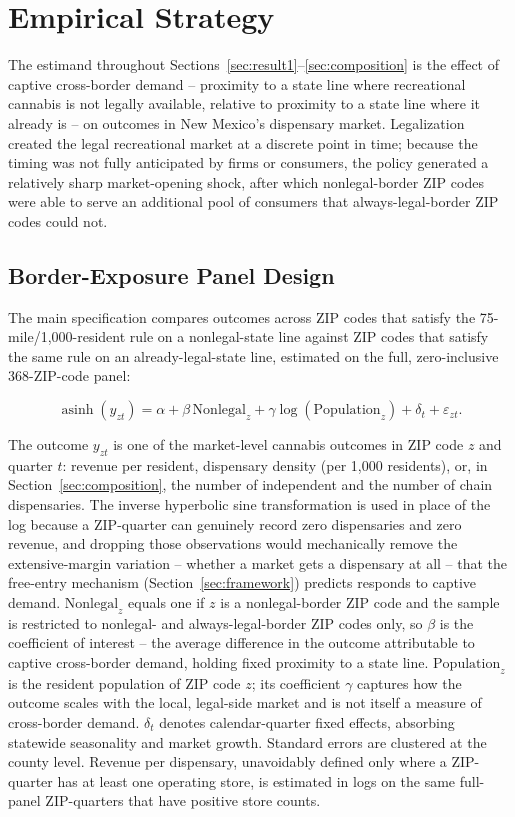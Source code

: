 \documentclass[english,12pt]{article}
\begin{document}
\section{Empirical Strategy}
\label{sec:empirical}

The estimand throughout Sections~\ref{sec:result1}--\ref{sec:composition} is the effect of captive cross-border demand -- proximity to a state line where recreational cannabis is not legally available, relative to proximity to a state line where it already is -- on outcomes in New Mexico's dispensary market. Legalization created the legal recreational market at a discrete point in time; because the timing was not fully anticipated by firms or consumers, the policy generated a relatively sharp market-opening shock, after which nonlegal-border ZIP codes were able to serve an additional pool of consumers that always-legal-border ZIP codes could not.

\subsection{Border-Exposure Panel Design}
\label{sec:borderexposure}

The main specification compares outcomes across ZIP codes that satisfy the 75-mile/1,000-resident rule on a nonlegal-state line against ZIP codes that satisfy the same rule on an already-legal-state line, estimated on the full, zero-inclusive 368-ZIP-code panel:

\begin{equation}
\label{baseline}
\operatorname{asinh}(y_{zt})=\alpha
+
\beta\, \text{Nonlegal}_z
+
\gamma \log(\text{Population}_z)
+
\delta_t
+
\varepsilon_{zt}.
\end{equation}

The outcome $y_{zt}$ is one of the market-level cannabis outcomes in ZIP code $z$ and quarter $t$: revenue per resident, dispensary density (per 1,000 residents), or, in Section~\ref{sec:composition}, the number of independent and the number of chain dispensaries. The inverse hyperbolic sine transformation is used in place of the log because a ZIP-quarter can genuinely record zero dispensaries and zero revenue, and dropping those observations would mechanically remove the extensive-margin variation -- whether a market gets a dispensary at all -- that the free-entry mechanism (Section~\ref{sec:framework}) predicts responds to captive demand. $\text{Nonlegal}_z$ equals one if $z$ is a nonlegal-border ZIP code and the sample is restricted to nonlegal- and always-legal-border ZIP codes only, so $\beta$ is the coefficient of interest -- the average difference in the outcome attributable to captive cross-border demand, holding fixed proximity to a state line. $\text{Population}_z$ is the resident population of ZIP code $z$; its coefficient $\gamma$ captures how the outcome scales with the local, legal-side market and is not itself a measure of cross-border demand. $\delta_t$ denotes calendar-quarter fixed effects, absorbing statewide seasonality and market growth. Standard errors are clustered at the county level. Revenue per dispensary, unavoidably defined only where a ZIP-quarter has at least one operating store, is estimated in logs on the same full-panel ZIP-quarters that have positive store counts.
\end{document}
